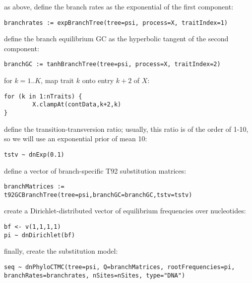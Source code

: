 as above, define the branch rates as the exponential of the first component:
{\tt \small \begin{snugshade*}
\begin{lstlisting}
branchrates := expBranchTree(tree=psi, process=X, traitIndex=1)
\end{lstlisting}
\end{snugshade*}}
define the branch equilibrium GC as the hyperbolic tangent of the second component:
{\tt \small \begin{snugshade*}
\begin{lstlisting}
branchGC := tanhBranchTree(tree=psi, process=X, traitIndex=2)
\end{lstlisting}
\end{snugshade*}}
for $k=1..K$, map trait $k$ onto entry $k+2$ of $X$:
{\tt \small \begin{snugshade*}
\begin{lstlisting}
for (k in 1:nTraits) {
        X.clampAt(contData,k+2,k)
}
\end{lstlisting}
\end{snugshade*}}
define the transition-transversion ratio; usually, this ratio is of the order of 1-10, so we will use an exponential prior of mean 10:
{\tt \small \begin{snugshade*}
\begin{lstlisting}
tstv ~ dnExp(0.1)
\end{lstlisting}
\end{snugshade*}}
define a vector of branch-specific T92 substitution matrices:
{\tt \small \begin{snugshade*}
\begin{lstlisting}
branchMatrices := t92GCBranchTree(tree=psi,branchGC=branchGC,tstv=tstv)
\end{lstlisting}
\end{snugshade*}}
create a Dirichlet-distributed vector of equilibrium frequencies over nucleotides:
{\tt \small \begin{snugshade*}
\begin{lstlisting}
bf <- v(1,1,1,1)
pi ~ dnDirichlet(bf)
\end{lstlisting}
\end{snugshade*}}
finally, create the substitution model:
{\tt \small \begin{snugshade*}
\begin{lstlisting}
seq ~ dnPhyloCTMC(tree=psi, Q=branchMatrices, rootFrequencies=pi, branchRates=branchrates, nSites=nSites, type="DNA")
\end{lstlisting}
\end{snugshade*}}
